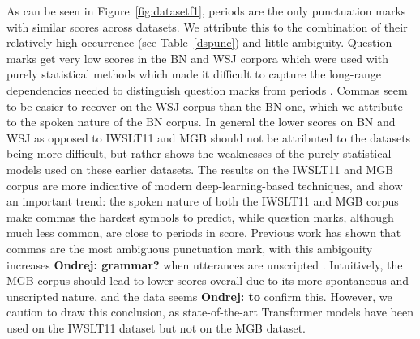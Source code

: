 \documentclass[bsc,deptreport,ai]{infthesis} %
\newcommand{\Ondrej}[1]{{\color{red} \textbf{Ondrej: #1}}}
\begin{document}
As can be seen in Figure~\ref{fig:datasetf1}, periods are the only punctuation marks with similar scores across datasets. We attribute this to the combination of their relatively high occurrence (see Table~\ref{dspunc}) and little ambiguity. Question marks get very low scores in the BN and WSJ corpora which were used with purely statistical methods which made it difficult to capture the long-range dependencies needed to distinguish question marks from periods \citep{christensen2001,gravano2009}. Commas seem to be easier to recover on the WSJ corpus than the BN one, which we attribute to the spoken nature of the BN corpus. In general the lower scores on BN and WSJ as opposed to IWSLT11 and MGB should not be attributed to the datasets being more difficult, but rather shows the weaknesses of the purely statistical models used on these earlier datasets. The results on the IWSLT11 and MGB corpus are more indicative of modern deep-learning-based techniques, and show an important trend: the spoken nature of both the IWSLT11 and MGB corpus make commas the hardest symbols to predict, while question marks, although much less common, are close to periods in score. Previous work has shown that commas are the most ambiguous punctuation mark, with this ambigouity increases\Ondrej{grammar?} when utterances are unscripted \citep{interannotator2020}. Intuitively, the MGB corpus should lead to lower scores overall due to its more spontaneous and unscripted nature, and the data seems \Ondrej{to} confirm this. However, we caution to draw this conclusion, as state-of-the-art Transformer models have been used on the IWSLT11 dataset but not on the MGB dataset.
\end{document}
